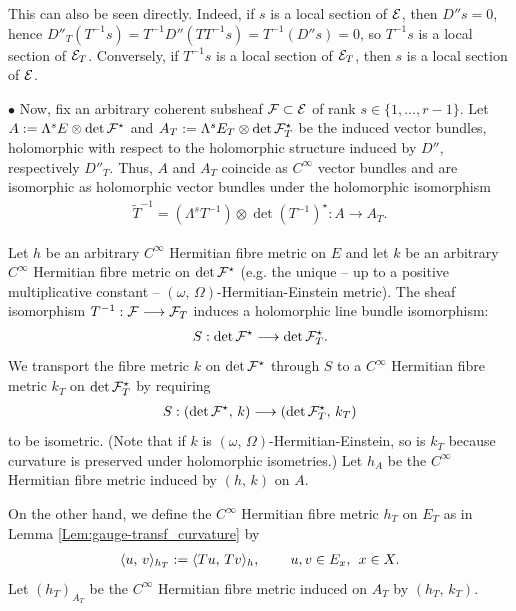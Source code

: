\documentclass[12pt]{article}
\begin{document}
This can also be seen directly. Indeed, if $s$ is a local section of ${\cal E}$, then $D''s=0$, hence $D''_T(T^{-1}s) = T^{-1}D''(TT^{-1}s) = T^{-1}(D''s) = 0$, so $T^{-1}s$ is a local section of ${\cal E}_T$. Conversely, if $T^{-1}s$ is a local section of ${\cal E}_T$, then $s$ is a local section of ${\cal E}$. 

\vspace{1ex}

$\bullet$ Now, fix an arbitrary coherent subsheaf ${\cal F}\subset{\cal E}$ of rank $s\in\{1,\dots , r-1\}$. Let $A:=\Lambda^sE\otimes\det{\cal F}^\star$ and $A_T:=\Lambda^sE_T\otimes\det{\cal F}_T^\star$ be the induced vector bundles, holomorphic with respect to the holomorphic structure induced by $D''$, respectively $D''_T$. Thus, $A$ and $A_T$ coincide as $C^\infty$ vector bundles and are isomorphic as holomorphic vector bundles under the holomorphic isomorphism \begin{eqnarray}\label{eqn:T-tilde_isom_def}\widetilde{T}^{-1}=(\Lambda^sT^{-1})\otimes\det(T^{-1})^\star : A \longrightarrow A_T.\end{eqnarray}


Let $h$ be an arbitrary $C^\infty$ Hermitian fibre metric on $E$ and let $k$ be an arbitrary $C^\infty$ Hermitian fibre metric on $\det{\cal F}^\star$ (e.g. the unique -- up to a positive multiplicative constant -- $(\omega,\,\Omega)$-Hermitian-Einstein metric). The sheaf isomorphism $T^{-1}:{\cal F}\longrightarrow{\cal F}_T$ induces a holomorphic line bundle isomorphism: \begin{eqnarray*}S:\det{\cal F}^\star\longrightarrow\det{\cal F}_T^\star.\end{eqnarray*} We transport the fibre metric $k$ on $\det{\cal F}^\star$ through $S$ to a $C^\infty$ Hermitian fibre metric $k_T$ on $\det{\cal F}_T^\star$ by requiring \begin{eqnarray*}S:(\det{\cal F}^\star,\,k)\longrightarrow(\det{\cal F}_T^\star,\,k_T)\end{eqnarray*} to be isometric. (Note that if $k$ is $(\omega,\,\Omega)$-Hermitian-Einstein, so is $k_T$ because curvature is preserved under holomorphic isometries.) Let $h_A$ be the $C^\infty$ Hermitian fibre metric induced by $(h,\,k)$ on $A$.

On the other hand, we define the $C^\infty$ Hermitian fibre metric $h_T$ on $E_T$ as in Lemma \ref{Lem:gauge-transf_curvature} by \begin{eqnarray*}\langle u,\,v\rangle_{h_T}:= \langle Tu,\,Tv\rangle_h, \hspace{5ex} u,v\in E_x,\hspace{1ex} x\in X.\end{eqnarray*} Let $(h_T)_{A_T}$ be the $C^\infty$ Hermitian fibre metric induced on $A_T$ by $(h_T,\,k_T)$.
\end{document}
